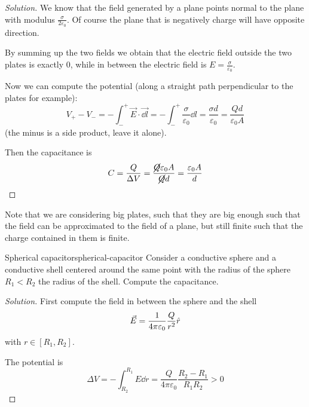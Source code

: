 \documentclass[12pt]{extarticle}
\begin{document}
\begin{proof}[Solution]
	We know that the field generated by a plane points normal to the plane with modulus $\frac{\sigma}{2\varepsilon_0}$.
	Of course the plane that is negatively charge will have opposite direction.

	By summing up the two fields we obtain that the electric field outside the two plates is exactly $0$, while in between the electric field is $E = \frac{\sigma}{\varepsilon_0}$.

	Now we can compute the potential (along a straight path perpendicular to the plates for example):
	\begin{equation}
		V_+ - V_- = - \int_-^+ \vec E \cdot \vec{\dd l} = - \int_-^+ \frac{\sigma}{\varepsilon_0} \dd{l} = \frac{\sigma d}{\varepsilon_0} = \frac{Q d}{\varepsilon_0 A}
	\end{equation}
	(the minus is a side product, leave it alone).

	Then the capacitance is
	\begin{equation}
		C = \frac{Q}{\Delta V} = \frac{\cancel{Q} \varepsilon_0 A}{\cancel{Q} d} = \frac{\varepsilon_0 A}{d}
	\end{equation}
\end{proof}

Note that we are considering big plates, such that they are big enough such that the field can be approximated to the field of a plane, but still finite such that the charge contained in them is finite.

\begin{example}{Spherical capacitor}{spherical-capacitor}
	Consider a conductive sphere and a conductive shell centered around the same point with the radius of the sphere $R_1 < R_2$ the radius of the shell.
	Compute the capacitance.
\end{example}

\begin{proof}[Solution]
	First compute the field in between the sphere and the shell
	\begin{equation}
		\vec E = \frac{1}{4 \pi \varepsilon_0} \frac{Q}{r^2} \hat r
	\end{equation}
	with $r \in [R_1, R_2]$.

	The potential is
	\begin{equation}
		\Delta V = - \int_{R_2}^{R_1} E \dd{r} = \frac{Q}{4 \pi \varepsilon_0} \frac{R_2 - R_1}{R_1 R_2} > 0
	\end{equation}
\end{proof}
\end{document}
